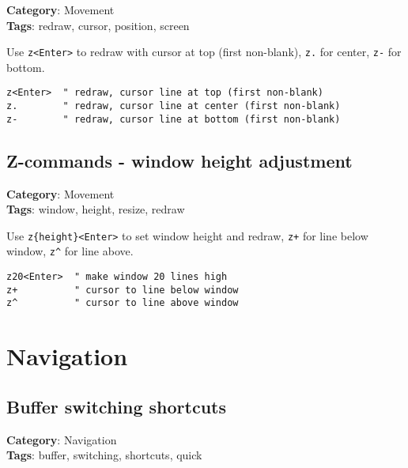 {{{{{{{\textbf{Category}: Movement\\ \textbf{Tags}: redraw, cursor, position, screen
\vspace{0.5cm}

Use {\footnotesize \Verb§z<Enter>§} to redraw with cursor at top (first non-blank), {\footnotesize \Verb§z.§} for center, {\footnotesize \Verb§z-§} for bottom.

\begin{Exa*}{}
\begin{Verbatim}[fontsize=\footnotesize, breaklines, breakanywhere]
z<Enter>  " redraw, cursor line at top (first non-blank)
z.        " redraw, cursor line at center (first non-blank)  
z-        " redraw, cursor line at bottom (first non-blank)
\end{Verbatim}
\end{Exa*}

\section{Z-commands - window height adjustment}

\textbf{Category}: Movement\\ \textbf{Tags}: window, height, resize, redraw
\vspace{0.5cm}

Use {\footnotesize \Verb§z{height}<Enter>§} to set window height and redraw, {\footnotesize \Verb§z+§} for line below window, {\footnotesize \Verb§z^§} for line above.

\begin{Exa*}{}
\begin{Verbatim}[fontsize=\footnotesize, breaklines, breakanywhere]
z20<Enter>  " make window 20 lines high
z+          " cursor to line below window
z^          " cursor to line above window
\end{Verbatim}
\end{Exa*}

\chapter{Navigation}
\section{Buffer switching shortcuts}

\textbf{Category}: Navigation\\ \textbf{Tags}: buffer, switching, shortcuts, quick
\vspace{0.5cm}

}}}}}}}
